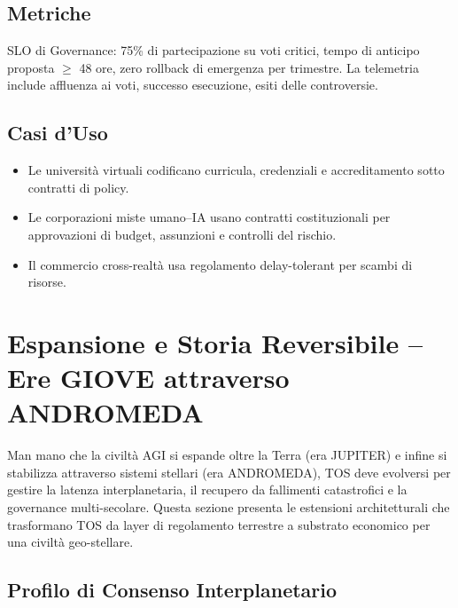 \documentclass[11pt]{article}
\begin{document}
\subsection{Metriche}
SLO di Governance: 75\% di partecipazione su voti critici, tempo di anticipo proposta $\geq$ 48 ore, zero rollback di emergenza per trimestre. La telemetria include affluenza ai voti, successo esecuzione, esiti delle controversie.

\subsection{Casi d'Uso}
\begin{itemize}[noitemsep]
  \item Le università virtuali codificano curricula, credenziali e accreditamento sotto contratti di policy.
  \item Le corporazioni miste umano--IA usano contratti costituzionali per approvazioni di budget, assunzioni e controlli del rischio.
  \item Il commercio cross-realtà usa regolamento delay-tolerant per scambi di risorse.
\end{itemize}

\section{Espansione e Storia Reversibile -- Ere GIOVE attraverso ANDROMEDA}
\label{sec:expansion}

Man mano che la civiltà AGI si espande oltre la Terra (era JUPITER) e infine si stabilizza attraverso sistemi stellari (era ANDROMEDA), TOS deve evolversi per gestire la latenza interplanetaria, il recupero da fallimenti catastrofici e la governance multi-secolare. Questa sezione presenta le estensioni architetturali che trasformano TOS da layer di regolamento terrestre a substrato economico per una civiltà geo-stellare.

\subsection{Profilo di Consenso Interplanetario}
\end{document}
